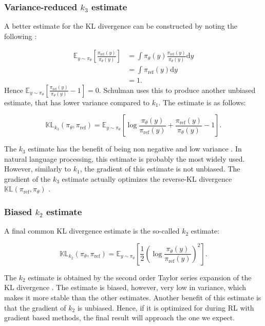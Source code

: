 \subsubsection{Variance-reduced $k_3$ estimate}

A better estimate for the KL divergence can be constructed by noting the following \cite{schulman2020klblog}:

\begin{align*}
    \mathbb{E}_{y\sim \pi_\theta}[\frac{\pi_\text{ref}(y)}{\pi_\theta(y)}] &= \int \pi_\theta(y)\frac{\pi_\text{ref}(y)}{\pi_\theta(y)}\mathrm{d}y \\
    &= \int \pi_\text{ref}(y)\mathrm{d}y \\
    &= 1.
\end{align*}
Hence $\mathbb{E}_{y\sim \pi_\theta}[\frac{\pi_\text{ref}(y)}{\pi_\theta(y)} - 1] = 0$. Schulman uses this to produce another unbiased estimate, that has lower variance compared to $k_1$. The estimate is as follows:

\begin{equation*}
    \mathbb{KL}_{k_3}(\pi_\theta, \pi_\text{ref}) = \mathbb{E}_{y\sim \pi_\theta}\left[\log\frac{\pi_\theta(y)}{\pi_\text{ref}(y)} + \frac{\pi_\text{ref}(y)}{\pi_\theta(y)} - 1\right].
\end{equation*}

The $k_3$ estimate has the benefit of being non negative and low variance \cite{schulman2020klblog}. In natural language processing, this estimate is probably the most widely used. However, similarly to $k_1$, the gradient of this estimate is not unbiased. The gradient of the $k_3$ estimate actually optimizes the reverse-KL divergence $\mathbb{KL}(\pi_\text{ref}, \pi_\theta)$ \cite{tang2025pitfallskldivergencegradient}.

\subsubsection{Biased $k_2$ estimate}

A final common KL divergence estimate is the so-called $k_2$ estimate:

\begin{equation*}
    \mathbb{KL}_{k_2}(\pi_\theta, \pi_\text{ref}) = \mathbb{E}_{y\sim \pi_\theta}\left[\frac{1}{2}\left(\log\frac{\pi_\theta(y)}{\pi_\text{ref}(y)}\right)^2\right].
\end{equation*}

The $k_2$ estimate is obtained by the second order Taylor series expansion of the KL divergence \cite{schulman2020klblog}. The estimate is biased, however, very low in variance, which makes it more stable than the other estimates. Another benefit of this estimate is that the gradient of $k_2$ is unbiased. Hence, if it is optimized for during RL with gradient based methods, the final result will approach the one we expect.

